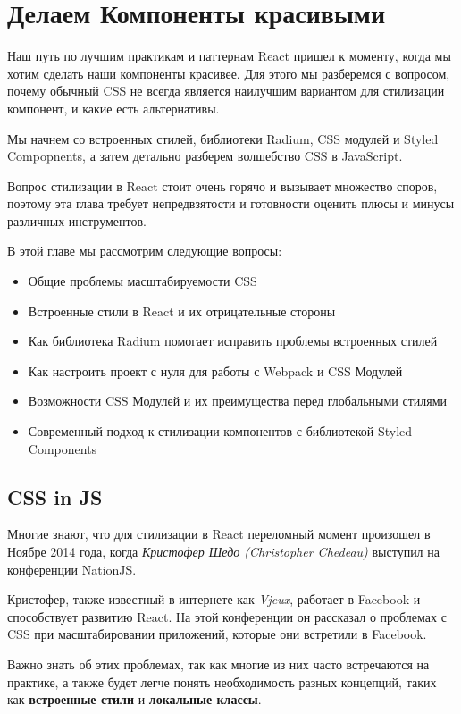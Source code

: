
\chapter{Делаем Компоненты красивыми}

Наш путь по лучшим практикам и паттернам React пришел к моменту, когда мы хотим сделать наши компоненты красивее. Для этого мы разберемся с вопросом, почему обычный CSS не всегда является наилучшим вариантом для стилизации компонент, и какие есть альтернативы.

Мы начнем со встроенных стилей, библиотеки Radium, CSS модулей и Styled Compopnents, а затем детально разберем волшебство CSS в JavaScript.

Вопрос стилизации в React стоит очень горячо и вызывает множество споров, поэтому эта глава требует непредвзятости и готовности оценить плюсы и минусы различных инструментов.

В этой главе мы рассмотрим следующие вопросы:

\begin{itemize}
	\item Общие проблемы масштабируемости CSS
	\item Встроенные стили в React и их отрицательные стороны
	\item Как библиотека Radium помогает исправить проблемы встроенных стилей
	\item Как настроить проект с нуля для работы с Webpack и CSS Модулей
	\item Возможности CSS Модулей и их преимущества перед глобальными стилями
	\item Современный подход к стилизации компонентов с библиотекой Styled Components
\end{itemize}

\section{CSS in JS}

Многие знают, что для стилизации в React переломный момент произошел в Ноябре 2014 года, когда \textit{Кристофер Шедо (Christopher Chedeau)} выступил на конференции NationJS.

Кристофер, также известный в интернете как \textit{Vjeux}, работает в Facebook и способствует развитию React. На этой конференции он рассказал о проблемах с CSS при масштабировании приложений, которые они встретили в Facebook.

Важно знать об этих проблемах, так как многие из них часто встречаются на практике, а также будет легче понять необходимость разных концепций, таких как \textbf{встроенные стили} и \textbf{локальные классы}.

